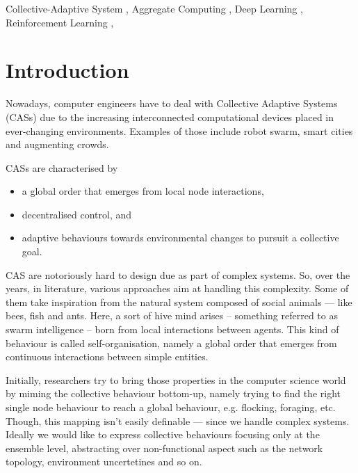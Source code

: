 \documentclass[
twocolumn,
]{ceurart}
\begin{document}
\begin{keywords}
  Collective-Adaptive System \sep
  Aggregate Computing \sep
  Deep Learning \sep
  Reinforcement Learning \sep
\end{keywords}


\maketitle
{}
\section{Introduction}
Nowadays, computer engineers have to deal with Collective Adaptive Systems (CASs)
 due to the increasing interconnected computational devices placed in ever-changing environments.
 Examples of those include robot swarm, smart cities and augmenting crowds.

CASs are characterised by 
\begin{itemize}
\item a global order that emerges from local node interactions, 
\item  decentralised control, and 
\item adaptive behaviours towards environmental changes to pursuit a collective goal.
\end{itemize}
CAS are notoriously hard to design due as part of complex systems. 
%
So, over the years, in literature, various approaches aim at handling this complexity. 
%
Some of them take inspiration from the natural system
 composed of social animals --- like bees, fish and ants. 
%
Here, a sort of hive mind arises -- 
 something referred to as swarm intelligence -- 
born from local interactions between agents. 
%
This kind of behaviour is called self-organisation, 
 namely a global order that emerges from continuous 
 interactions between simple entities.

Initially, researchers try to bring those properties in the computer science world 
 by miming the collective behaviour bottom-up, 
 namely trying to find the right single node behaviour 
 to reach a global behaviour, e.g. flocking, foraging, etc.
%
Though, this mapping isn't easily definable ---
 since we handle complex systems.
%
Ideally we would like to express collective behaviours focusing only at the ensemble level,
 abstracting over non-functional aspect such as the network topology, environment uncertetines and 
 so on.
\end{document}

